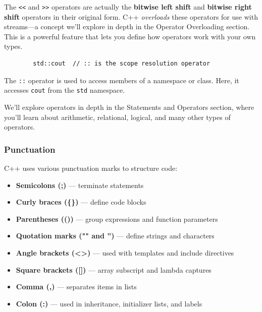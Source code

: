 \begin{remark}
	The \texttt{<<} and \texttt{>>} operators are actually the \textbf{bitwise left shift} and \textbf{bitwise right shift} operators in their original form. C++ \textit{overloads} these operators for use with streams—a concept we'll explore in depth in the Operator Overloading section. This is a powerful feature that lets you define how operators work with your own types.
\end{remark}

\begin{example}{\leavevmode}
	
	\begin{lstlisting}
		std::cout  // :: is the scope resolution operator
	\end{lstlisting}
	
	The \texttt{::} operator is used to access members of a namespace or class. Here, it accesses \texttt{cout} from the \texttt{std} namespace.
\end{example}

We'll explore operators in depth in the Statements and Operators section, where you'll learn about arithmetic, relational, logical, and many other types of operators.

\subsubsection{Punctuation}

C++ uses various punctuation marks to structure code:

\begin{itemize}
	\item \textbf{Semicolons (;)} — terminate statements
	\item \textbf{Curly braces (\{\})} — define code blocks
	\item \textbf{Parentheses (())} — group expressions and function parameters
	\item \textbf{Quotation marks ("" and '')} — define strings and characters
	\item \textbf{Angle brackets (<>)} — used with templates and include directives
	\item \textbf{Square brackets ([])} — array subscript and lambda captures
	\item \textbf{Comma (,)} — separates items in lists
	\item \textbf{Colon (:)} — used in inheritance, initializer lists, and labels
\end{itemize}

